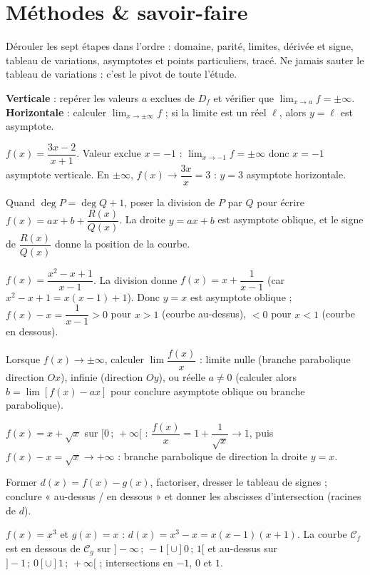 \section{Méthodes \& savoir-faire}

Dérouler les sept étapes dans l'ordre : domaine, parité, limites, dérivée et signe,
tableau de variations, asymptotes et points particuliers, tracé. Ne jamais sauter le
tableau de variations : c'est le pivot de toute l'étude.

\textbf{Verticale} : repérer les valeurs $a$ exclues de $D_f$ et vérifier que
$\lim_{x\to a}f=\pm\infty$. \textbf{Horizontale} : calculer $\lim_{x\to\pm\infty}f$ ; si
la limite est un réel $\ell$, alors $y=\ell$ est asymptote.
\begin{exemple}
$f(x)=\dfrac{3x-2}{x+1}$. Valeur exclue $x=-1$ : $\lim_{x\to-1}f=\pm\infty$ donc $x=-1$
asymptote verticale. En $\pm\infty$, $f(x)\to\dfrac{3x}{x}=3$ : $y=3$ asymptote horizontale.
\end{exemple}

Quand $\deg P=\deg Q+1$, poser la division de $P$ par $Q$ pour écrire
$f(x)=ax+b+\dfrac{R(x)}{Q(x)}$. La droite $y=ax+b$ est asymptote oblique, et le signe de
$\dfrac{R(x)}{Q(x)}$ donne la position de la courbe.
\begin{exemple}
$f(x)=\dfrac{x^2-x+1}{x-1}$. La division donne $f(x)=x+\dfrac{1}{x-1}$ (car
$x^2-x+1=x(x-1)+1$). Donc $y=x$ est asymptote oblique ; $f(x)-x=\dfrac{1}{x-1}>0$ pour
$x>1$ (courbe au-dessus), $<0$ pour $x<1$ (courbe en dessous).
\end{exemple}

Lorsque $f(x)\to\pm\infty$, calculer $\lim\dfrac{f(x)}{x}$ : limite nulle (branche
parabolique direction $Ox$), infinie (direction $Oy$), ou réelle $a\neq 0$ (calculer
alors $b=\lim[f(x)-ax]$ pour conclure asymptote oblique ou branche parabolique).
\begin{exemple}
$f(x)=x+\sqrt{x}$ sur $[0\,;\,+\infty[$ : $\dfrac{f(x)}{x}=1+\dfrac{1}{\sqrt{x}}\to 1$,
puis $f(x)-x=\sqrt{x}\to+\infty$ : branche parabolique de direction la droite $y=x$.
\end{exemple}

Former $d(x)=f(x)-g(x)$, factoriser, dresser le tableau de signes ; conclure « au-dessus /
en dessous » et donner les abscisses d'intersection (racines de $d$).
\begin{exemple}
$f(x)=x^3$ et $g(x)=x$ : $d(x)=x^3-x=x(x-1)(x+1)$. La courbe $\mathcal{C}_f$ est en
dessous de $\mathcal{C}_g$ sur $]-\infty\,;\,-1[\cup]0\,;\,1[$ et au-dessus sur
$]-1\,;\,0[\cup]1\,;\,+\infty[$ ; intersections en $-1$, $0$ et $1$.
\end{exemple}

